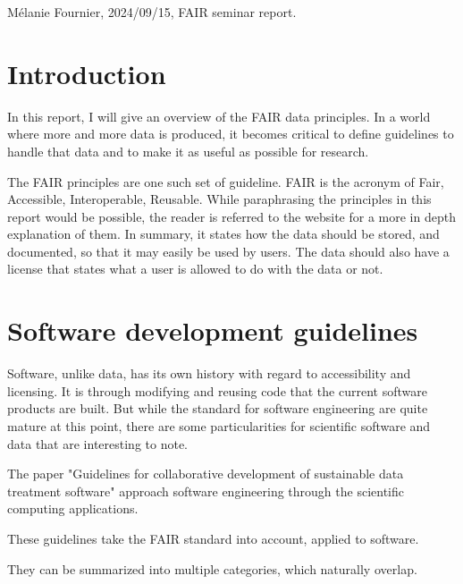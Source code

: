 \documentclass{article}
\begin{document}
Mélanie Fournier, 2024/09/15, FAIR seminar report.


\section{Introduction}

In this report, I will give an overview of the FAIR data principles. In a world where more and more data is produced, it becomes critical to define guidelines to handle that data and to make it as useful as possible for research. 

The FAIR principles are one such set of guideline. FAIR is the acronym of Fair, Accessible, Interoperable, Reusable. While paraphrasing the principles in this report would be possible, the reader is referred to the website for a more in depth explanation of them. In summary, it states how the data should be stored, and documented, so that it may easily be used by users. The data should also have a license that states what a user is allowed to do with the data or not. 



\section{Software development guidelines}

Software, unlike data, has its own history with regard to accessibility and licensing. It is through modifying and reusing code that the current software products are built. But while the standard for software engineering are quite mature at this point, there are some particularities for scientific software and data that are interesting to note. 

The paper "Guidelines for collaborative development of sustainable data treatment software"\cite{Wuttke2022} approach software engineering through the scientific computing applications. 

These guidelines take the FAIR standard into account, applied to software.

They can be summarized into multiple categories, which naturally overlap.
\end{document}
